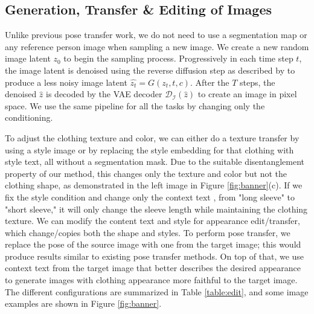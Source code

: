 \documentclass[10pt,twocolumn,letterpaper]{article}
\begin{document}
\subsection{Generation, Transfer \& Editing of Images}
Unlike previous pose transfer work, we do not need to use a segmentation map or any reference person image when sampling a new image. We create a new random image latent $z_0$ to begin the sampling process. Progressively in each time step $t$, the image latent is denoised using the reverse diffusion step as described by \cite{diffusion_model} to produce a less noisy image latent $\hat{z_t}=G(z_t, t, c)$. After the $T$ steps, the denoised $\hat{z}$ is decoded by the VAE decoder $\mathcal{D_I}(\hat{z})$ to create an image in pixel space. We use the same pipeline for all the tasks by changing only the conditioning.

To adjust the clothing texture and color, we can either do a texture transfer by using a style image or by replacing the style embedding for that clothing with style text, all without a segmentation mask. Due to the suitable disentanglement property of our method, this changes only the texture and color but not the clothing shape, as demonstrated in the left image in Figure \ref{fig:banner}(c). If we fix the style condition and change only the context text \eg, from "long sleeve" to "short sleeve," it will only change the sleeve length while maintaining the clothing texture. We can modify the content text and style for appearance edit/transfer, which change/copies both the shape and styles. To perform pose transfer, we replace the pose of the source image with one from the target image; this would produce results similar to existing pose transfer methods. On top of that, we use context text from the target image that better describes the desired appearance to generate images with clothing appearance more faithful to the target image. The different configurations are summarized in Table \ref{table:edit}, and some image examples are shown in Figure \ref{fig:banner}.
\end{document}
